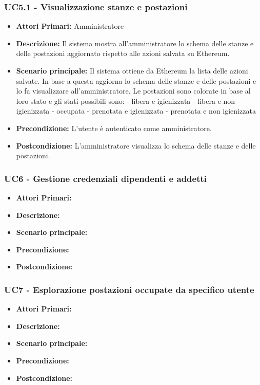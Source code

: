 \subsubsection{ UC5.1 - Visualizzazione stanze e postazioni}
\begin{itemize}
	\item\textbf{Attori Primari:}
	Amministratore\\ 
	\item\textbf{Descrizione:}
	Il sistema mostra all'amministratore lo schema delle stanze e delle postazioni aggiornato rispetto alle azioni salvata su Ethereum.
	\item\textbf{Scenario principale:}
	Il sistema ottiene da Ethereum la lista delle azioni salvate. In base a questa aggiorna lo schema delle stanze e delle postazioni e lo fa visualizzare all'amministratore. Le postazioni sono colorate in base al loro stato e gli stati possibili sono:
	- libera e igienizzata
	- libera e non igienizzata
	- occupata
	- prenotata e igienizzata
	- prenotata e non igienizzata
	\item\textbf{Precondizione:} 
	L'utente è autenticato come amministratore.
	\item\textbf{Postcondizione:}
	L'amministratore visualizza lo schema delle stanze e delle postazioni.
\end{itemize}

\subsubsection{ UC6 - Gestione credenziali dipendenti e addetti}
\begin{itemize}
           	\item\textbf{Attori Primari:} 
           	\item\textbf{Descrizione:} 
           	\item\textbf{Scenario principale:} 
           	\item\textbf{Precondizione:} 
           	\item\textbf{Postcondizione:}
\end{itemize}

\subsubsection{ UC7 - Esplorazione postazioni occupate da specifico utente}
\begin{itemize}
           	\item\textbf{Attori Primari:} 
           	\item\textbf{Descrizione:} 
           	\item\textbf{Scenario principale:} 
           	\item\textbf{Precondizione:} 
           	\item\textbf{Postcondizione:}
\end{itemize}

